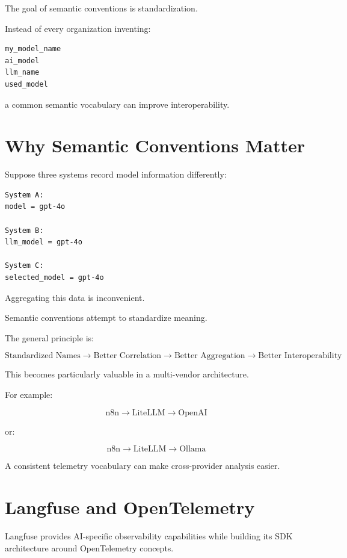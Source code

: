 \documentclass[11pt,a4paper]{article}
\begin{document}
The goal of semantic conventions is standardization.

Instead of every organization inventing:

\begin{lstlisting}
my_model_name
ai_model
llm_name
used_model
\end{lstlisting}

a common semantic vocabulary can improve interoperability.

\section{Why Semantic Conventions Matter}

Suppose three systems record model information differently:

\begin{lstlisting}
System A:
model = gpt-4o

System B:
llm_model = gpt-4o

System C:
selected_model = gpt-4o
\end{lstlisting}

Aggregating this data is inconvenient.

Semantic conventions attempt to standardize meaning.

The general principle is:

\[
\boxed{
\text{Standardized Names}
\rightarrow
\text{Better Correlation}
\rightarrow
\text{Better Aggregation}
\rightarrow
\text{Better Interoperability}
}
\]

This becomes particularly valuable in a multi-vendor architecture.

For example:

\[
\text{n8n}
\rightarrow
\text{LiteLLM}
\rightarrow
\text{OpenAI}
\]

or:

\[
\text{n8n}
\rightarrow
\text{LiteLLM}
\rightarrow
\text{Ollama}
\]

A consistent telemetry vocabulary can make cross-provider analysis easier.

\section{Langfuse and OpenTelemetry}

Langfuse provides AI-specific observability capabilities while building its SDK architecture around OpenTelemetry concepts.
\end{document}
